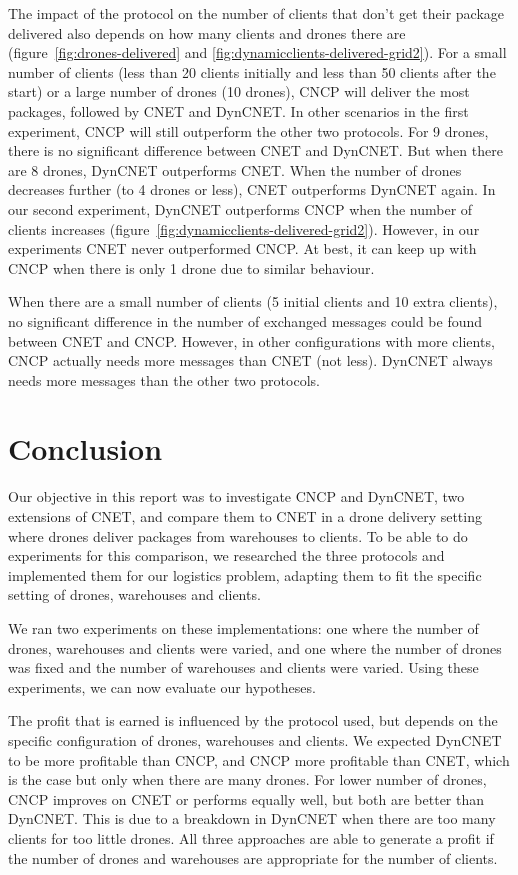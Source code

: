 \documentclass[10pt,a4paper,twocolumn]{article}
\begin{document}
The impact of the protocol on the number of clients that don't get their package delivered also depends on how many clients and drones there are (figure~\ref{fig:drones-delivered} and \ref{fig:dynamicclients-delivered-grid2}). For a small number of clients (less than 20 clients initially and less than 50 clients after the start) or a large number of drones (10 drones), CNCP will deliver the most packages, followed by CNET and DynCNET. In other scenarios in the first experiment, CNCP will still outperform the other two protocols. For 9 drones, there is no significant difference between CNET and DynCNET. But when there are 8 drones, DynCNET outperforms CNET. When the number of drones decreases further (to 4 drones or less), CNET outperforms DynCNET again. 
In our second experiment, DynCNET outperforms CNCP when the number of clients increases (figure~\ref{fig:dynamicclients-delivered-grid2}). However, in our experiments CNET never outperformed CNCP. At best, it can keep up with CNCP when there is only 1 drone due to similar behaviour. 

When there are a small number of clients (5 initial clients and 10 extra clients), no significant difference in the number of exchanged messages could be found between CNET and CNCP. However, in other configurations with more clients, CNCP actually needs more messages than CNET (not less). DynCNET always needs more messages than the other two protocols.

\section{Conclusion}
Our objective in this report was to investigate CNCP and DynCNET, two extensions of CNET, and compare them to CNET in a drone delivery setting where drones deliver packages from warehouses to clients. To be able to do experiments for this comparison, we researched the three protocols and implemented them for our logistics problem, adapting them to fit the specific setting of drones, warehouses and clients.

We ran two experiments on these implementations: one where the number of drones, warehouses and clients were varied, and one where the number of drones was fixed and the number of warehouses and clients were varied. Using these experiments, we can now evaluate our hypotheses.

The profit that is earned is influenced by the protocol used, but depends on the specific configuration of drones, warehouses and clients. We expected DynCNET to be more profitable than CNCP, and CNCP more profitable than CNET, which is the case but only when there are many drones. For lower number of drones, CNCP improves on CNET or performs equally well, but both are better than DynCNET. This is due to a breakdown in DynCNET when there are too many clients for too little drones. All three approaches are able to generate a profit if the number of drones and warehouses are appropriate for the number of clients.
\end{document}
